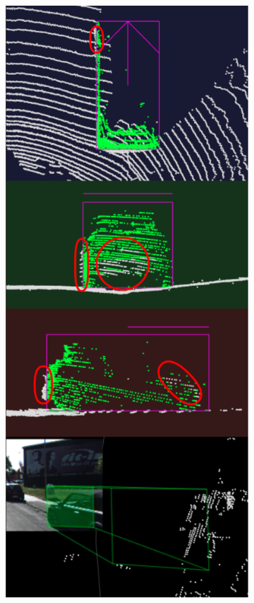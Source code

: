 \documentclass[letterpaper, 10 pt, conference]{ieeeconf}  %
\begin{document}
\begin{figure}
\begin{subfigure}{0.3\linewidth}
	\end{subfigure}
	~
	\begin{subfigure}{0.3\linewidth}
		\includegraphics[scale=0.2]{./figures/annocheck-1}
	\end{subfigure}

\end{figure}
\end{document}
